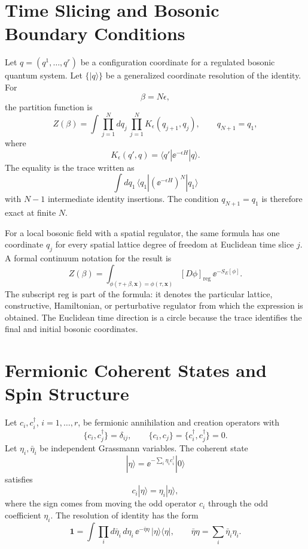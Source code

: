 \section{Time Slicing and Bosonic Boundary Conditions}

Let \(q=(q^1,\ldots,q^r)\) be a configuration coordinate for a regulated
bosonic quantum system.  Let \(\{|q\rangle\}\) be a generalized coordinate
resolution of the identity.  For
\[
  \beta=N\epsilon ,
\]
the partition function is
\begin{equation}
  Z(\beta)
  =
  \int \prod_{j=1}^{N}dq_j\,
  \prod_{j=1}^{N}
  K_\epsilon(q_{j+1},q_j),
  \qquad
  q_{N+1}=q_1,
  \label{eq:thermal-bosonic-time-slicing}
\end{equation}
where
\[
  K_\epsilon(q',q)=\langle q'|\ee^{-\epsilon H}|q\rangle .
\]
The equality is the trace written as
\[
  \int dq_1\,\langle q_1|(\ee^{-\epsilon H})^N|q_1\rangle
\]
with \(N-1\) intermediate identity insertions.  The condition
\(q_{N+1}=q_1\) is therefore exact at finite \(N\).

For a local bosonic field with a spatial regulator, the same formula has one
coordinate \(q_j\) for every spatial lattice degree of freedom at Euclidean
time slice \(j\).  A formal continuum notation for the result is
\[
  Z(\beta)
  =
  \int_{\phi(\tau+\beta,\mathbf x)=\phi(\tau,\mathbf x)}
  [D\phi]_{\mathrm{reg}}\,
  \ee^{-S_E[\phi]} .
\]
The subscript \(\mathrm{reg}\) is part of the formula: it denotes the
particular lattice, constructive, Hamiltonian, or perturbative regulator from
which the expression is obtained.  The Euclidean time direction is a circle
because the trace identifies the final and initial bosonic coordinates.

\section{Fermionic Coherent States and Spin Structure}

Let \(c_i,c_i^\dagger\), \(i=1,\ldots,r\), be fermionic annihilation and
creation operators with
\[
  \{c_i,c_j^\dagger\}=\delta_{ij},
  \qquad
  \{c_i,c_j\}=\{c_i^\dagger,c_j^\dagger\}=0.
\]
Let \(\eta_i,\bar\eta_i\) be independent Grassmann variables.  The coherent
state
\[
  |\eta\rangle=\ee^{-\sum_i \eta_i c_i^\dagger}|0\rangle
\]
satisfies
\[
  c_i|\eta\rangle=\eta_i|\eta\rangle ,
\]
where the sign comes from moving the odd operator \(c_i\) through the odd
coefficient \(\eta_i\).  The resolution of identity has the form
\[
  \mathbf 1
  =
  \int \prod_i d\bar\eta_i\,d\eta_i\,
  \ee^{-\bar\eta\eta}\,
  |\eta\rangle\langle\eta| ,
  \qquad
  \bar\eta\eta=\sum_i\bar\eta_i\eta_i .
\]

